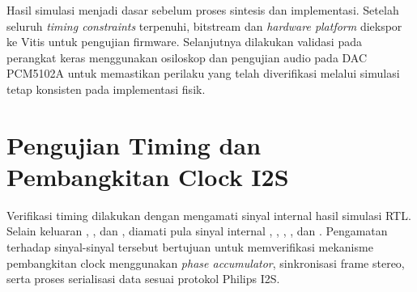 Hasil simulasi menjadi dasar sebelum proses sintesis dan implementasi. Setelah seluruh \textit{timing constraints} terpenuhi, bitstream dan \textit{hardware platform} diekspor ke Vitis untuk pengujian firmware. Selanjutnya dilakukan validasi pada perangkat keras menggunakan osiloskop dan pengujian audio pada DAC PCM5102A untuk memastikan perilaku yang telah diverifikasi melalui simulasi tetap konsisten pada implementasi fisik.

\section{Pengujian Timing dan Pembangkitan Clock I2S}

Verifikasi timing dilakukan dengan mengamati sinyal internal hasil simulasi RTL. Selain keluaran , , dan , diamati pula sinyal internal , , , , dan . Pengamatan terhadap sinyal-sinyal tersebut bertujuan untuk memverifikasi mekanisme pembangkitan clock menggunakan \textit{phase accumulator}, sinkronisasi frame stereo, serta proses serialisasi data sesuai protokol Philips I2S.


